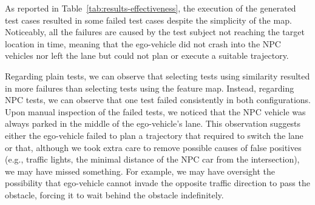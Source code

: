 \documentclass[conference]{IEEEtran}
\begin{document}
As reported in Table~\ref{tab:results-effectiveness}, the execution of the generated test cases resulted in some failed test cases despite the simplicity of the map. Noticeably, all the failures are caused by the test subject not reaching the target location in time, meaning that the ego-vehicle did not crash into the NPC vehicles nor left the lane but could not plan or execute a suitable trajectory. 

Regarding plain tests, we can observe that selecting tests using similarity resulted in more failures than selecting tests using the feature map. Instead, regarding NPC tests, we can observe that one test failed consistently in both configurations. Upon manual inspection of the failed tests, we noticed that the NPC vehicle was always parked in the middle of the ego-vehicle's lane. This observation suggests either the ego-vehicle failed to plan a trajectory that required to switch the lane or that, although we took extra care to remove possible causes of false positives (e.g., traffic lights, the minimal distance of the NPC car from the intersection), we may have missed something. For example, we may have oversight the possibility that ego-vehicle cannot invade the opposite traffic direction to pass the obstacle, forcing it to wait behind the obstacle indefinitely.
\end{document}

